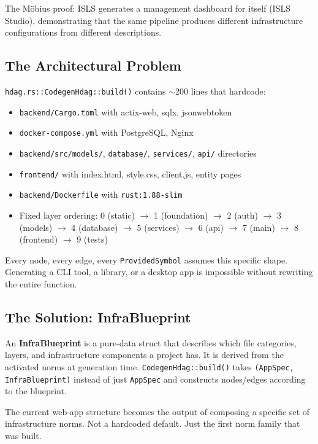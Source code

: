 \documentclass[11pt,a4paper]{article}
\begin{document}
The M\"obius proof: ISLS generates a management dashboard for itself
(ISLS Studio), demonstrating that the same pipeline produces different
infrastructure configurations from different descriptions.

\subsection{The Architectural Problem}

\texttt{hdag.rs::CodegenHdag::build()} contains $\sim$200 lines that
hardcode:

\begin{itemize}[nosep]
\item \texttt{backend/Cargo.toml} with actix-web, sqlx, jsonwebtoken
\item \texttt{docker-compose.yml} with PostgreSQL, Nginx
\item \texttt{backend/src/models/}, \texttt{database/}, \texttt{services/}, 
      \texttt{api/} directories
\item \texttt{frontend/} with index.html, style.css, client.js, 
      entity pages
\item \texttt{backend/Dockerfile} with \texttt{rust:1.88-slim}
\item Fixed layer ordering: 0 (static) $\to$ 1 (foundation) $\to$ 
      2 (auth) $\to$ 3 (models) $\to$ 4 (database) $\to$ 5 (services) 
      $\to$ 6 (api) $\to$ 7 (main) $\to$ 8 (frontend) $\to$ 9 (tests)
\end{itemize}

Every node, every edge, every \texttt{ProvidedSymbol} assumes this 
specific shape. Generating a CLI tool, a library, or a desktop app 
is impossible without rewriting the entire function.

\subsection{The Solution: InfraBlueprint}

An \textbf{InfraBlueprint} is a pure-data struct that describes which 
file categories, layers, and infrastructure components a project has.
It is derived from the activated norms at generation time. 
\texttt{CodegenHdag::build()} takes \texttt{(AppSpec, InfraBlueprint)} 
instead of just \texttt{AppSpec} and constructs nodes/edges according 
to the blueprint.

The current web-app structure becomes the output of composing a specific
set of infrastructure norms. Not a hardcoded default. Just the first 
norm family that was built.
\end{document}
